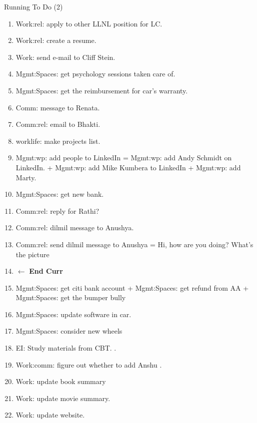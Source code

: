 \begin{frame}{Running To Do (2)} 
  \begin{enumerate}
    \conti    

\item \tiny Work:rel: apply to other LLNL position for LC. 
  \dl{}
  
\item Work:rel: create a resume. 
\item Work: send e-mail to Cliff Stein.   

\item Mgmt:Spaces: get psychology sessions taken care of. 

\item Mgmt:Spaces: get the reimbursement for car's warranty. 

\item Comm: message to Renata.
\item Comm:rel: email to Bhakti. 

\item \tiny worklife: make projects list.
\item \tiny Mgmt:wp: add people to LinkedIn =  Mgmt:wp: add
  Andy Schmidt on LinkedIn. +  Mgmt:wp: add Mike Kumbera to
  LinkedIn + Mgmt:wp: add Marty. 
      
\item Mgmt:Spaces: get new bank. 
\item Comm:rel: reply for Rathi?
\item Comm:rel: dilmil message to Anushya.
\item \tiny Comm:rel: send dilmil message to Anushya = Hi, how are you doing? What's the picture

  \item[] \tiny  $\leftarrow$ \textbf{End Curr}
  \item \tiny Mgmt:Spaces: get citi bank account + Mgmt:Spaces: get refund from AA  + Mgmt:Spaces: get the bumper bully 
  \item \tiny Mgmt:Spaces: update software  in car. 
  \item \tiny  Mgmt:Spaces: consider new wheels 
  \item \tiny EI: Study materials from CBT.   .
  \item \tiny Work:comm: figure out whether to add Anshu .

\item \tiny Work: update book summary 
\item \tiny Work: update movie summary. 
\item \tiny Work: update website. 
  \end{enumerate}
\end{frame}
